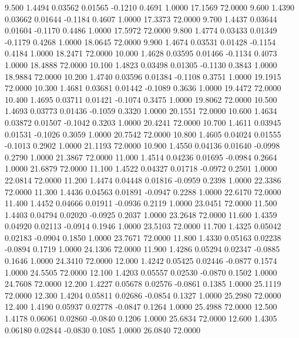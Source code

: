    9.500   1.4494   0.03562   0.01565  -0.1210   0.4691   1.0000  17.1569  72.0000
   9.600   1.4390   0.03662   0.01644  -0.1184   0.4607   1.0000  17.3373  72.0000
   9.700   1.4437   0.03644   0.01604  -0.1170   0.4486   1.0000  17.5972  72.0000
   9.800   1.4774   0.03433   0.01349  -0.1179   0.4268   1.0000  18.0645  72.0000
   9.900   1.4674   0.03531   0.01428  -0.1154   0.4184   1.0000  18.2471  72.0000
  10.000   1.4628   0.03595   0.01466  -0.1134   0.4073   1.0000  18.4888  72.0000
  10.100   1.4823   0.03498   0.01305  -0.1130   0.3843   1.0000  18.9884  72.0000
  10.200   1.4740   0.03596   0.01384  -0.1108   0.3751   1.0000  19.1915  72.0000
  10.300   1.4681   0.03681   0.01442  -0.1089   0.3636   1.0000  19.4472  72.0000
  10.400   1.4695   0.03711   0.01421  -0.1074   0.3475   1.0000  19.8062  72.0000
  10.500   1.4693   0.03773   0.01436  -0.1059   0.3320   1.0000  20.1551  72.0000
  10.600   1.4634   0.03872   0.01507  -0.1042   0.3203   1.0000  20.4241  72.0000
  10.700   1.4611   0.03945   0.01531  -0.1026   0.3059   1.0000  20.7542  72.0000
  10.800   1.4605   0.04024   0.01555  -0.1013   0.2902   1.0000  21.1193  72.0000
  10.900   1.4550   0.04136   0.01640  -0.0998   0.2790   1.0000  21.3867  72.0000
  11.000   1.4514   0.04236   0.01695  -0.0984   0.2664   1.0000  21.6879  72.0000
  11.100   1.4522   0.04327   0.01718  -0.0972   0.2501   1.0000  22.0814  72.0000
  11.200   1.4474   0.04448   0.01816  -0.0959   0.2398   1.0000  22.3386  72.0000
  11.300   1.4436   0.04563   0.01891  -0.0947   0.2288   1.0000  22.6170  72.0000
  11.400   1.4452   0.04666   0.01911  -0.0936   0.2119   1.0000  23.0451  72.0000
  11.500   1.4403   0.04794   0.02020  -0.0925   0.2037   1.0000  23.2648  72.0000
  11.600   1.4359   0.04920   0.02113  -0.0914   0.1946   1.0000  23.5103  72.0000
  11.700   1.4325   0.05042   0.02183  -0.0904   0.1850   1.0000  23.7671  72.0000
  11.800   1.4330   0.05163   0.02238  -0.0894   0.1719   1.0000  24.1306  72.0000
  11.900   1.4286   0.05294   0.02347  -0.0885   0.1646   1.0000  24.3410  72.0000
  12.000   1.4242   0.05425   0.02446  -0.0877   0.1574   1.0000  24.5505  72.0000
  12.100   1.4203   0.05557   0.02530  -0.0870   0.1502   1.0000  24.7608  72.0000
  12.200   1.4227   0.05678   0.02576  -0.0861   0.1385   1.0000  25.1119  72.0000
  12.300   1.4204   0.05811   0.02686  -0.0854   0.1327   1.0000  25.2980  72.0000
  12.400   1.4190   0.05937   0.02778  -0.0847   0.1264   1.0000  25.4988  72.0000
  12.500   1.4178   0.06061   0.02860  -0.0840   0.1206   1.0000  25.6834  72.0000
  12.600   1.4305   0.06180   0.02844  -0.0830   0.1085   1.0000  26.0840  72.0000
